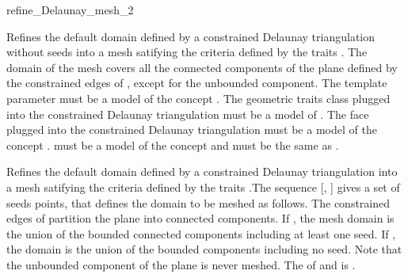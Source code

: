 \begin{ccRefFunction}{refine_Delaunay_mesh_2}


{ Refines the default domain defined by a constrained Delaunay
  triangulation without seeds into a mesh satifying the criteria
  defined by the traits . The domain of the mesh
  covers all the connected components of the plane defined by the
  constrained edges of , except for the unbounded component.
  \ccPrecond The template parameter  must be a model of the
  concept . The geometric traits
  class plugged into the constrained Delaunay triangulation must be a model
  of .
  \ccRequire The face plugged into the constrained
  Delaunay triangulation must be a model of the concept
  .  must be a model of the
  concept  and  must be the same
  as . }

                     { Refines the default domain defined by a constrained
                       Delaunay triangulation into a mesh
                       satifying the criteria defined by the traits
                       .The sequence [, ]
                       gives a set of seeds points, that defines the domain
                       to be meshed as follows. The constrained edges of
                        partition the plane into connected components.
                       If , the mesh domain is the union of
                       the bounded connected components including at least
                       one seed. If , the domain is the
                       union of the bounded components including no seed.
                       Note that the unbounded component of the plane is
                       never meshed.
                       \ccRequire The  of  and
                        is .}

\end{ccRefFunction}

